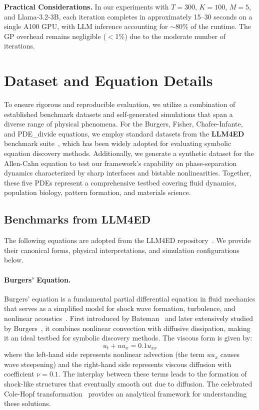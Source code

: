 \textbf{Practical Considerations.} In our experiments with $T=300$, $K=100$, $M=5$, and Llama-3.2-3B, each iteration completes in approximately 15--30 seconds on a single A100 GPU, with LLM inference accounting for $\sim$80\% of the runtime. The GP overhead remains negligible ($<$1\%) due to the moderate number of iterations.

\section{Dataset and Equation Details}
\label{app:data}

To ensure rigorous and reproducible evaluation, we utilize a combination of established benchmark datasets and self-generated simulations that span a diverse range of physical phenomena. For the Burgers, Fisher, Chafee-Infante, and PDE\_divide equations, we employ standard datasets from the \textbf{LLM4ED} benchmark suite~\cite{du2024llm4ed}, which has been widely adopted for evaluating symbolic equation discovery methods. Additionally, we generate a synthetic dataset for the Allen-Cahn equation to test our framework's capability on phase-separation dynamics characterized by sharp interfaces and bistable nonlinearities. Together, these five PDEs represent a comprehensive testbed covering fluid dynamics, population biology, pattern formation, and materials science.



\subsection{Benchmarks from LLM4ED}

The following equations are adopted from the LLM4ED repository~\cite{du2024llm4ed}. We provide their canonical forms, physical interpretations, and simulation configurations below.

\paragraph{Burgers' Equation.} 
Burgers' equation is a fundamental partial differential equation in fluid mechanics that serves as a simplified model for shock wave formation, turbulence, and nonlinear acoustics~\cite{burgers1948mathematical,whitham2011linear}. First introduced by Bateman~\cite{bateman1915some} and later extensively studied by Burgers~\cite{burgers1948mathematical}, it combines nonlinear convection with diffusive dissipation, making it an ideal testbed for symbolic discovery methods. The viscous form is given by:
\begin{equation}
    u_t + u u_x = 0.1 u_{xx}
\end{equation}
where the left-hand side represents nonlinear advection (the term $u u_x$ causes wave steepening) and the right-hand side represents viscous diffusion with coefficient $\nu = 0.1$. The interplay between these terms leads to the formation of shock-like structures that eventually smooth out due to diffusion. The celebrated Cole-Hopf transformation~\cite{cole1951quasi,hopf1950partial} provides an analytical framework for understanding these solutions.

